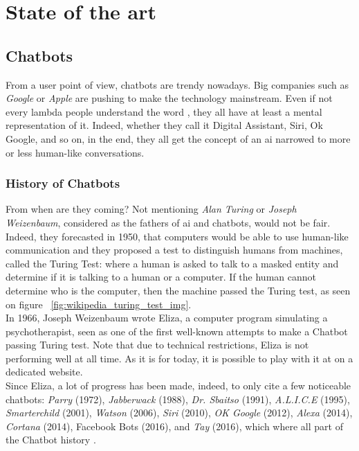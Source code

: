 \chapter{State of the art}
\label{chap:state-of-the-art}

\section{Chatbots}
From a user point of view, chatbots are trendy nowadays. Big companies such as \textit{Google} or \textit{Apple} are pushing to make the technology mainstream. Even if not every lambda people understand the word , they all have at least a mental representation of it. Indeed, whether they call it Digital Assistant, Siri, Ok Google, and so on, in the end, they all get the concept of an \gls{ai} narrowed to more or less human-like conversations.

\subsection{History of Chatbots}
From when are they coming? Not mentioning \textit{Alan Turing} or \textit{Joseph Weizenbaum}, considered as the fathers of \gls{ai} and chatbots, would not be fair. Indeed, they forecasted in 1950, that computers would be able to use human-like communication and they proposed a test to distinguish humans from machines, called the Turing Test\cite{paper:turing}: where a human is asked to talk to a masked entity and determine if it is talking to a human or a computer. If the human cannot determine who is the computer, then the machine passed the Turing test, as seen on figure ~\ref{fig:wikipedia_turing_test_img}. \\

In 1966, Joseph Weizenbaum wrote Eliza\cite{chatbot:eliza}, a computer program simulating a psychotherapist, seen as one of the first well-known attempts to make a Chatbot passing Turing test. Note that due to technical restrictions, Eliza is not performing well at all time. As it is for today, it is possible to play with it at on a dedicated website.\\

Since Eliza, a lot of progress has been made, indeed, to only cite a few noticeable chatbots: \textit{Parry}\cite{chatbot:parry} (1972), \textit{Jabberwack}\cite{chatbot:jabberwack} (1988), \textit{Dr. Sbaitso}\cite{chatbot:dr-sbaitso} (1991), \textit{A.L.I.C.E}\cite{chatbot:alice} (1995), \textit{Smarterchild}\cite{chatbot:smarterchild} (2001), \textit{Watson}\cite{chatbot:watson} (2006), \textit{Siri}\cite{chatbot:siri} (2010), \textit{OK Google}\cite{chatbot:google} (2012), \textit{Alexa}\cite{chatbot:alexa} (2014), \textit{Cortana}\cite{chatbot:cortana} (2014), Facebook Bots\cite{chatbot:facebook} (2016), and \textit{Tay}\cite{chatbot:tay} (2016), which where all part of the Chatbot history \cite{chatbot:futurism_history_infography}.\\

